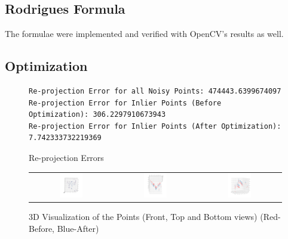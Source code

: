\documentclass[a4paper]{article}
\begin{document}
\subsection{Rodrigues Formula}
The formulae were implemented and verified with OpenCV's results as well.

\subsection{Optimization}

\begin{figure}[!ht]
\centering
\begin{BVerbatim}
Re-projection Error for all Noisy Points: 474443.6399674097
Re-projection Error for Inlier Points (Before Optimization): 306.2297910673943
Re-projection Error for Inlier Points (After Optimization): 7.742333732219369
\end{BVerbatim}
\caption{Re-projection Errors}
\end{figure}

\begin{figure}[!ht]
\centering
\begin{tabular}{ccc}
{\includegraphics[width=0.3\textwidth]{images/ba_plot1.png}} &
{\includegraphics[width=0.3\textwidth]{images/ba_plot2.png}} &
{\includegraphics[width=0.3\textwidth]{images/ba_plot3.png}}
\end{tabular}
\caption{3D Visualization of the Points (Front, Top and Bottom views) (Red-Before, Blue-After)}
\end{figure}
\end{document}
